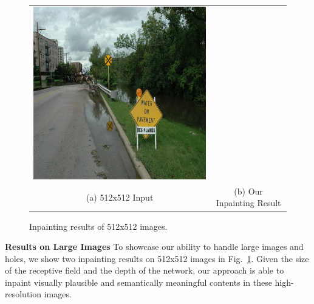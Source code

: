 \begin{figure}[h!]
\begin{tabular}{cc}
\includegraphics[width=.45\textwidth]{figures/random_512/test_latest/images/000000344611_synthesized_image.jpg}\\ 
(a) 512x512 Input & (b) Our Inpainting Result \\ 
\end{tabular} 
\caption{Inpainting results of 512x512 images.}
\label{fig:large} 
\end{figure}  

\noindent\textbf{Results on Large Images} To showcase our ability to handle large images and holes, we show two inpainting results on 512x512 images in Fig.~\ref{fig:large}. Given the size of the receptive field and the depth of the network, our approach is able to inpaint visually plausible and semantically meaningful contents in these high-resolution images. 

